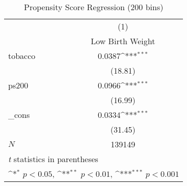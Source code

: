 \begin{table}[htbp]\centering
\def\sym#1{\ifmmode^{#1}\else\(^{#1}\)\fi}
\caption{Propensity Score Regression (200 bins)\label{h2}}
\begin{tabular}{l*{1}{c}}
\hline\hline
            &\multicolumn{1}{c}{(1)}\\
            &\multicolumn{1}{c}{Low Birth Weight}\\
\hline
tobacco     &      0.0387\sym{***}\\
            &     (18.81)         \\
[1em]
ps200       &      0.0966\sym{***}\\
            &     (16.99)         \\
[1em]
\_cons      &      0.0334\sym{***}\\
            &     (31.45)         \\
\hline
\(N\)       &      139149         \\
\hline\hline
\multicolumn{2}{l}{\footnotesize \textit{t} statistics in parentheses}\\
\multicolumn{2}{l}{\footnotesize \sym{*} \(p<0.05\), \sym{**} \(p<0.01\), \sym{***} \(p<0.001\)}\\
\end{tabular}
\end{table}
